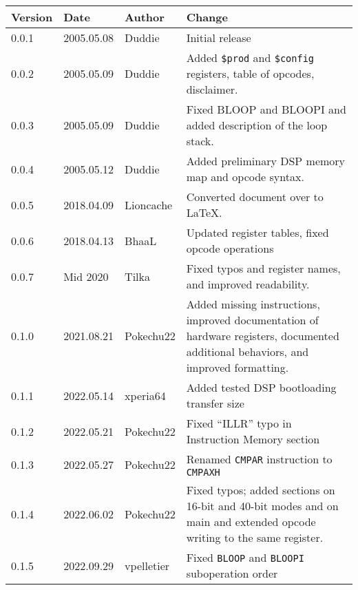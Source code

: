 \documentclass[oneside,english,a4paper,10pt,oneside,openany,final]{memoir}
\newcommand{\Register}[1]{\texttt{#1}}
\begin{document}
\begin{table}[htb]
\centering
\begin{tabular}{|p{.5in}|p{.75in}|p{.75in}|p{3.5in}|}
\hline
\textbf{Version} & \textbf{Date} & \textbf{Author} & \textbf{Change}                                                                          \\ \hline
0.0.1            & 2005.05.08    & Duddie          & Initial release                                                                          \\ \hline
0.0.2            & 2005.05.09    & Duddie          & Added \Register{\$prod} and \Register{\$config} registers, table of opcodes, disclaimer. \\ \hline
0.0.3            & 2005.05.09    & Duddie          & Fixed BLOOP and BLOOPI and added description of the loop stack.                          \\ \hline
0.0.4            & 2005.05.12    & Duddie          & Added preliminary DSP memory map and opcode syntax.                                      \\ \hline
0.0.5            & 2018.04.09    & Lioncache       & Converted document over to LaTeX.                                                        \\ \hline
0.0.6            & 2018.04.13    & BhaaL           & Updated register tables, fixed opcode operations                                         \\ \hline
0.0.7            & Mid 2020      & Tilka           & Fixed typos and register names, and improved readability.                                \\ \hline
0.1.0            & 2021.08.21    & Pokechu22       & Added missing instructions, improved documentation of hardware registers, documented additional behaviors, and improved formatting. \\ \hline
0.1.1            & 2022.05.14    & xperia64        & Added tested DSP bootloading transfer size                                               \\ \hline
0.1.2            & 2022.05.21    & Pokechu22       & Fixed ``ILLR'' typo in Instruction Memory section                                        \\ \hline
0.1.3            & 2022.05.27    & Pokechu22       & Renamed \texttt{CMPAR} instruction to \texttt{CMPAXH}                                    \\ \hline
0.1.4            & 2022.06.02    & Pokechu22       & Fixed typos; added sections on 16-bit and 40-bit modes and on main and extended opcode writing to the same register. \\ \hline
0.1.5            & 2022.09.29    & vpelletier      & Fixed \texttt{BLOOP} and \texttt{BLOOPI} suboperation order \\ \hline
\end{tabular}
\end{table}
\end{document}
